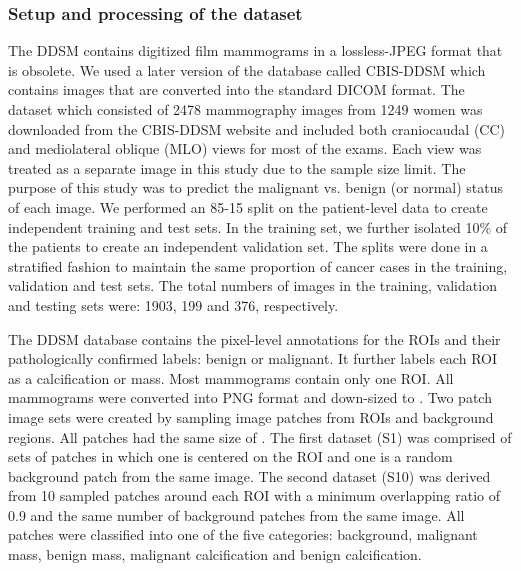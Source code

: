 \documentclass[12pt,letterpaper]{article}
\begin{document}
\subsubsection{Setup and processing of the dataset}
The DDSM \cite{heath_digital_2001} contains digitized film mammograms in a lossless-JPEG format that is obsolete. We used a later version of the database called CBIS-DDSM \cite{lee_curated_2016} which contains images that are converted into the standard DICOM format. The dataset which consisted of 2478 mammography images from 1249 women was downloaded from the CBIS-DDSM website and included both craniocaudal (CC) and mediolateral oblique (MLO) views for most of the exams. Each view was treated as a separate image in this study due to the sample size limit. The purpose of this study was to predict the malignant vs. benign (or normal) status of each image. We performed an 85-15 split on the patient-level data to create independent training and test sets. In the training set, we further isolated 10\% of the patients to create an independent validation set. The splits were done in a stratified fashion to maintain the same proportion of cancer cases in the training, validation and test sets. The total numbers of images in the training, validation and testing sets were: 1903, 199 and 376, respectively. 

The DDSM database contains the pixel-level annotations for the ROIs and their pathologically confirmed labels: benign or malignant. It further labels each ROI as a calcification or mass. Most mammograms contain only one ROI. All mammograms were converted into PNG format and down-sized to . Two patch image sets were created by sampling image patches from ROIs and background regions. All patches had the same size of . The first dataset (S1) was comprised of sets of patches in which one is centered on the ROI and one is a random background patch from the same image. The second dataset (S10) was derived from 10 sampled patches around each ROI with a minimum overlapping ratio of 0.9 and the same number of background patches from the same image. All patches were classified into one of the five categories: background, malignant mass, benign mass, malignant calcification and benign calcification.
\end{document}
